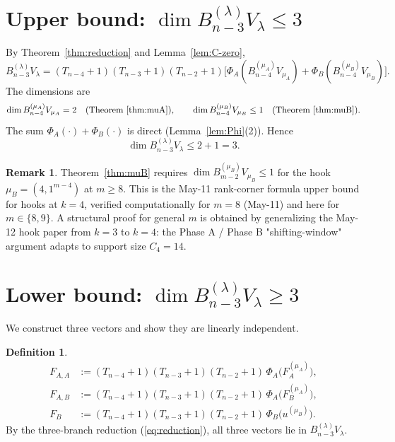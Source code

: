\documentclass[11pt]{article}
\theoremstyle{definition}
\newtheorem{definition}[theorem]{Definition}
\newtheorem{remark}[theorem]{Remark}
\begin{document}
\section{Upper bound: $\dim B_{n-3}^{(\lambda)} V_\lambda \le 3$}
\label{sec:upper}

By Theorem~\ref{thm:reduction} and Lemma~\ref{lem:C-zero},
\[
   B_{n-3}^{(\lambda)} V_\lambda = (T_{n-4}{+}1)(T_{n-3}{+}1)(T_{n-2}{+}1)
   \big[\Phi_A(B_{n-4}^{(\mu_A)} V_{\mu_A}) +
        \Phi_B(B_{n-4}^{(\mu_B)} V_{\mu_B})\big].
\]
The dimensions are
\[
   \dim B_{n-4}^{(\mu_A)} V_{\mu_A} = 2
   \quad \text{(Theorem~\ref{thm:muA})},
   \qquad
   \dim B_{n-4}^{(\mu_B)} V_{\mu_B} \le 1
   \quad \text{(Theorem~\ref{thm:muB})}.
\]
The sum $\Phi_A(\cdot) + \Phi_B(\cdot)$ is direct
(Lemma~\ref{lem:Phi}(2)). Hence
\[
   \dim B_{n-3}^{(\lambda)} V_\lambda \le 2 + 1 = 3.
\]

\begin{remark}\label{rem:hook}
Theorem~\ref{thm:muB} requires $\dim B^{(\mu_B)}_{m-2} V_{\mu_B} \le
1$ for the hook $\mu_B = (4, 1^{m-4})$ at $m \ge 8$. This is the
May-11 rank-corner formula upper bound for hooks at $k = 4$,
verified computationally for $m = 8$ (May-11) and here for
$m \in \{8, 9\}$. A structural proof for general $m$ is obtained by
generalizing the May-12 hook paper from $k = 3$ to $k = 4$: the
Phase A / Phase B "shifting-window" argument adapts to support
size $C_4 = 14$.
\end{remark}

\section{Lower bound: $\dim B_{n-3}^{(\lambda)} V_\lambda \ge 3$}
\label{sec:lower}

We construct three vectors and show they are linearly independent.

\begin{definition}\label{def:Fs}
\begin{align*}
   F_{A,A} &:= (T_{n-4}{+}1)(T_{n-3}{+}1)(T_{n-2}{+}1)\,
   \Phi_A\big(F_A^{(\mu_A)}\big),\\
   F_{A,B} &:= (T_{n-4}{+}1)(T_{n-3}{+}1)(T_{n-2}{+}1)\,
   \Phi_A\big(F_B^{(\mu_A)}\big),\\
   F_B &:= (T_{n-4}{+}1)(T_{n-3}{+}1)(T_{n-2}{+}1)\,
   \Phi_B\big(u^{(\mu_B)}\big).
\end{align*}
By the three-branch reduction (\ref{eq:reduction}), all three
vectors lie in $B_{n-3}^{(\lambda)} V_\lambda$.
\end{definition}
\end{document}
